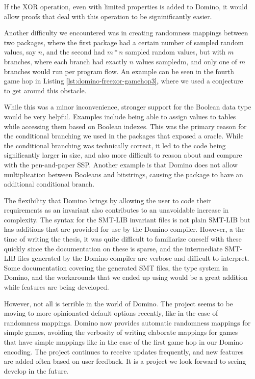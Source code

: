 

If the XOR operation, even with limited properties is added to Domino, it would allow proofs that deal with this operation to be signinificantly easier. 

Another difficulty we encountered was in creating randomness mappings between two packages, where the first package had a certain number of sampled random values, say $n$, and the second had $m*n$ sampled random values, but with $m$ branches, where each branch had exactly $n$ values sampledm, and only one of $m$ branches would run per program flow. An example can be seen in the fourth game hop in Listing \ref{lst:domino-freexor-gamehop3}, where we used a conjecture to get around this obstacle.

While this was a minor inconvenience, stronger support for the Boolean data type would be very helpful. Examples include being able to assign values to tables while accessing them based on Boolean indexes. This was the primary reason for the conditional branching we used in the packages that exposed a  oracle. While the conditional branching was technically correct, it led to the code being significantly larger in size, and also more difficult to reason about and compare with the pen-and-paper SSP. Another example is that Domino does not allow multiplication between Booleans and bitstrings, causing the  package to have an additional conditional branch. 

The flexibility that Domino brings by allowing the user to code their requirements as an invariant also contributes to an unavoidable increase in complexity. The syntax for the SMT-LIB invariant files is not plain SMT-LIB but has additions that are provided for use by the Domino compiler. However, a the time of writing the thesis, it was quite difficult to familiarize oneself with these quickly since the documentation on these is sparse, and the intermediate SMT-LIB files generated by the Domino compiler are verbose and difficult to interpret. 
Some documentation covering the generated SMT files, the type system in Domino, and the workarounds that we ended up using would be a great addition while features are being developed. 

However, not all is terrible in the world of Domino. The project seems to be moving to more opinionated default options recently, like in the case of randomness mappings. Domino now provides automatic randomness mappings for simple games, avoiding the verbosity of writing elaborate mappings for games that have simple mappings like in the case of the first game hop in our Domino encoding. The project continues to receive updates frequently, and new features are added often based on user feedback. It is a project we look forward to seeing develop in the future.


